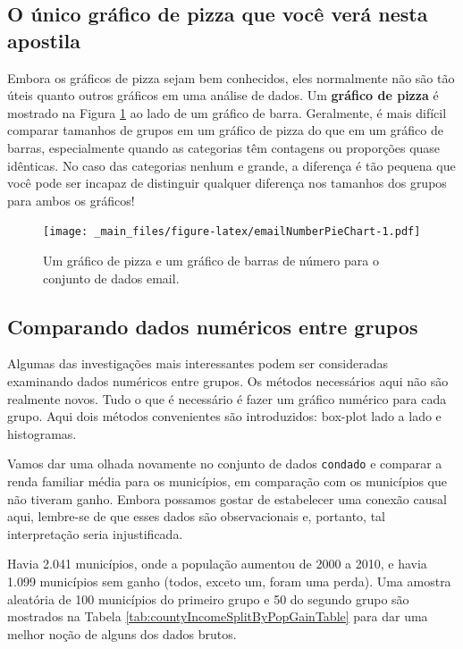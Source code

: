 \documentclass[
]{book}
\theoremstyle{definition}
\theoremstyle{definition}
\theoremstyle{definition}
\theoremstyle{definition}
\theoremstyle{remark}
\begin{document}
\hypertarget{onlyPizzaGraph}{%
\subsection{O único gráfico de pizza que você verá nesta apostila}\label{onlyPizzaGraph}}

Embora os gráficos de pizza sejam bem conhecidos, eles normalmente não são tão úteis quanto outros gráficos em uma análise de dados. Um \textbf{gráfico de pizza} é mostrado na Figura \ref{fig:emailNumberPieChart} ao lado de um gráfico de barra. Geralmente, é mais difícil comparar tamanhos de grupos em um gráfico de pizza do que em um gráfico de barras, especialmente quando as categorias têm contagens ou proporções quase idênticas. No caso das categorias nenhum e grande, a diferença é tão pequena que você pode ser incapaz de distinguir qualquer diferença nos tamanhos dos grupos para ambos os gráficos!

\begin{figure}
\centering
\texttt{[image: \_main\_files/figure-latex/emailNumberPieChart-1.pdf]}
\caption{\label{fig:emailNumberPieChart}Um gráfico de pizza e um gráfico de barras de número para o conjunto de dados email.}
\end{figure}

\hypertarget{comparingAcrossGroups}{%
\subsection{Comparando dados numéricos entre grupos}\label{comparingAcrossGroups}}

Algumas das investigações mais interessantes podem ser consideradas examinando dados numéricos entre grupos. Os métodos necessários aqui não são realmente novos. Tudo o que é necessário é fazer um gráfico numérico para cada grupo. Aqui dois métodos convenientes são introduzidos: box-plot lado a lado e histogramas.

Vamos dar uma olhada novamente no conjunto de dados \texttt{condado} e comparar a renda familiar média para os municípios, em comparação com os municípios que não tiveram ganho. Embora possamos gostar de estabelecer uma conexão causal aqui, lembre-se de que esses dados são observacionais e, portanto, tal interpretação seria injustificada.

Havia 2.041 municípios, onde a população aumentou de 2000 a 2010, e havia 1.099 municípios sem ganho (todos, exceto um, foram uma perda). Uma amostra aleatória de 100 municípios do primeiro grupo e 50 do segundo grupo são mostrados na Tabela \ref{tab:countyIncomeSplitByPopGainTable} para dar uma melhor noção de alguns dos dados brutos.
\end{document}
